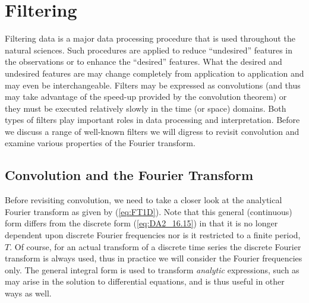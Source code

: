 

\section{Filtering}

Filtering data is a major data processing procedure that is used throughout the natural sciences.  Such procedures are applied to
reduce ``undesired'' features in the observations or to enhance the ``desired'' features.  What the desired and
undesired features are may change completely from application to application and may even be interchangeable.
Filters may be expressed as convolutions (and thus may take advantage
of the speed-up provided by the convolution theorem) or they must be executed relatively slowly in the time (or space) domains.
Both types of filters play important roles in data processing and interpretation.  Before we discuss a range of well-known
filters we will digress to revisit convolution and examine various properties of the Fourier transform.

\subsection{Convolution and the Fourier Transform}

Before revisiting convolution, we need to take a closer look at the analytical
Fourier transform as given by (\ref{eq:FT1D}).
Note that this general (continuous) form differs from the discrete form (\ref{eq:DA2_16.15}) in that it is no
longer dependent upon discrete Fourier frequencies nor is it restricted to a finite period, $T$.
Of course, for an actual transform of a discrete time series the discrete Fourier transform is always
used, thus in practice we will consider the Fourier frequencies only. The general integral form is used to transform
\emph{analytic} expressions, such as may arise in the solution to differential equations, and is thus useful in other ways as well.

